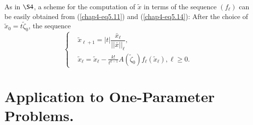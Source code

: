 As in $\S 4$, a scheme for the computation of $\widetilde{x}$ in terms
of the sequence $(f_{\ell})$ can be easily obtained from
(\ref{chap4-eq5.11}) and (\ref{chap4-eq5.14}): After the choice of
$\widetilde{x}_{0} = t\widetilde{\zeta}_{0}$, the sequence
\begin{equation*}
\begin{cases}
& \widetilde{x}_{\ell + 1} = |t|
  \dfrac{\bar{x}_{\ell}}{||\bar{x}||_{\ell}}, \\
& \widetilde{x}_{\ell} = \widetilde{x}_{\ell} - \frac{k!}{t^{k-1}}
  A(\widetilde{\zeta}_{0}) f_{\ell}(\widetilde{x}_{\ell}), \ell \geq 0.
\end{cases}\tag{5.17}\label{chap4-eq5.17}
\end{equation*}

\section{Application to One-Parameter Problems.}\label{chap4-sec6}

